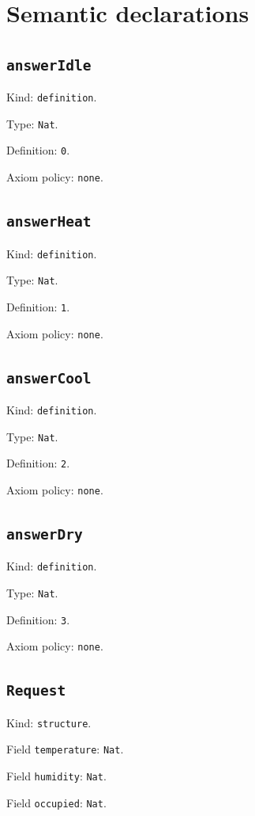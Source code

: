 \documentclass[11pt]{article}
\begin{document}
\section*{Semantic declarations}
\subsection*{\texttt{answerIdle}}
\noindent Kind: \texttt{definition}.\par
\noindent Type: \texttt{Nat}.\par
\noindent Definition: \texttt{0}.\par
\noindent Axiom policy: \texttt{none}.\par
\subsection*{\texttt{answerHeat}}
\noindent Kind: \texttt{definition}.\par
\noindent Type: \texttt{Nat}.\par
\noindent Definition: \texttt{1}.\par
\noindent Axiom policy: \texttt{none}.\par
\subsection*{\texttt{answerCool}}
\noindent Kind: \texttt{definition}.\par
\noindent Type: \texttt{Nat}.\par
\noindent Definition: \texttt{2}.\par
\noindent Axiom policy: \texttt{none}.\par
\subsection*{\texttt{answerDry}}
\noindent Kind: \texttt{definition}.\par
\noindent Type: \texttt{Nat}.\par
\noindent Definition: \texttt{3}.\par
\noindent Axiom policy: \texttt{none}.\par
\subsection*{\texttt{Request}}
\noindent Kind: \texttt{structure}.\par
\noindent Field \texttt{temperature}: \texttt{Nat}.\par
\noindent Field \texttt{humidity}: \texttt{Nat}.\par
\noindent Field \texttt{occupied}: \texttt{Nat}.\par
\end{document}
